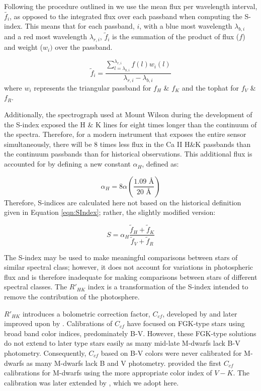 Following the procedure outlined in \citet{Lov11} we use the mean flux per
wavelength interval, $\tilde{f_{i}}$, as opposed to the integrated flux over
each passband when computing the S-index. This means that for each passband,
$i$, with a blue most wavelength $\lambda_{b,i}$ and a red most wavelength
$\lambda_{r,i}$, $\tilde{f}_{i}$ is the summation of the product of flux ($f$)
and weight ($w_{i})$ over the passband.

\begin{equation}\label{eqn:meanFlux}
    \tilde{f}_{i} = \frac{\sum_{l = \lambda_{b,i}}^{\lambda_{r,i}}f(l)w_{i}(l)}{\lambda_{r,i}-\lambda_{b,i}}    
\end{equation}
\noindent where $w_{i}$ represents the triangular passband for $f_{H}$ \& $f_{K}$ and the tophat for $f_{V}$ \& $f_{R}$.

Additionally, the spectrograph used at Mount Wilson during the development of
the S-index exposed the H \& K lines for eight times longer than the continuum
of the spectra. Therefore, for a modern instrument that exposes the entire
sensor simultaneously, there will be 8 times less flux in the Ca II H\&K
passbands than the continuum passbands than for historical observations. This
additional flux is accounted for by defining a new constant $\alpha_{H}$,
defined as:

\begin{equation}
    \alpha_{H} = 8\alpha\left(\frac{1.09\text{ \AA}}{20\text{ \AA}}\right)
\end{equation}
Therefore, S-indices are calculated here not based on the historical definition
given in Equation \ref{eqn:SIndex}; rather, the slightly modified version:

\begin{equation}\label{eqn:finalSIndex}
    S = \alpha_{H}\frac{\tilde{f}_{H} + \tilde{f}_{K}}{\tilde{f}_{V} + \tilde{f}_{R}}
\end{equation}

The S-index may be used to make meaningful comparisons between stars of similar
spectral class; however, it does not account for variations in photospheric
flux and is therefore inadequate for making comparisons between stars of
different spectral classes. The $R'_{HK}$ index \citep{Middelkoop1982} is a
transformation of the S-index intended to remove the contribution of the
photosphere. 

$R'_{HK}$ introduces a bolometric correction factor, $C_{cf}$, developed by
\citet{Middelkoop1982} and later improved upon by \citet{Rutten1984}.
Calibrations of $C_{cf}$ have focused on FGK-type stars using broad band color
indices, predominately B-V. However, these FGK-type solutions do not extend to
later type stars easily as many mid-late M-dwarfs lack B-V photometry.
Consequently, $C_{cf}$ based on B-V colors were never calibrated for M-dwarfs
as many M-dwarfs lack B and V photometry. \citet{SuarezMascareno2016} provided
the first $C_{cf}$ calibrations for M-dwarfs using the more appropriate color
index of $V-K$. The calibration was later extended by \citet{Def17}, which we
adopt here. 

